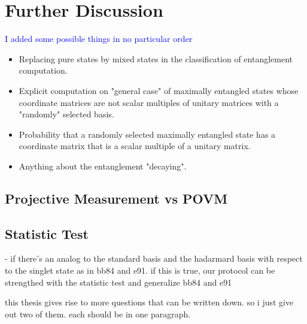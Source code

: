 
\chapter{Further Discussion} %

\label{Chapter7-further discussion} %

\textcolor{blue}{I added some possible things in no particular order}

\begin{itemize}
\item Replacing pure states by mixed states in the classification of entanglement computation.
\item Explicit computation on "general case" of maximally entangled states whose coordinate matrices are not scalar multiples of unitary matrices with a "randomly" selected basis.
\item Probability that a randomly selected maximally entangled state has a coordinate matrix that is a scalar multiple of a unitary matrix.
\item Anything about the entanglement "decaying".
\end{itemize}

\section{Projective Measurement vs POVM}

\section{Statistic Test}
- if there's an analog to the standard basis and the hadarmard basis with respect to the singlet state as in bb84 and e91. if this is true, our protocol can be strengthed with the statistic test and  generalize bb84 and e91

this thesis gives rise to more questions that can be written down. so i just give out two of them. each should be in one paragraph.

